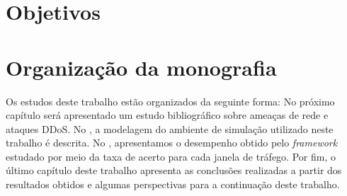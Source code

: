 \section{Objetivos}

\section{Organização da monografia}
Os estudos deste trabalho estão organizados da seguinte forma: No próximo capítulo será apresentado um estudo bibliográfico sobre ameaças de rede e ataques DDoS. No , a modelagem do ambiente de simulação utilizado neste trabalho é descrita. No , apresentamos o desempenho obtido pelo \textit{framework} estudado por meio da taxa de acerto para cada janela de tráfego. Por fim, o último capítulo deste trabalho apresenta as conclusões realizadas a partir dos resultados obtidos e algumas perspectivas para a continuação deste trabalho. 